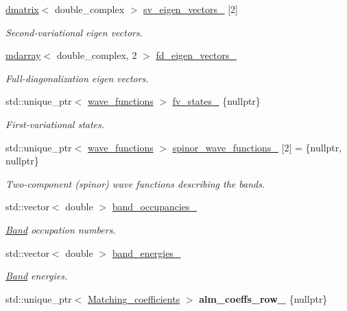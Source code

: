 \begin{DoxyCompactItemize}
\item 
\hyperlink{classsddk_1_1dmatrix}{dmatrix}$<$ double\+\_\+complex $>$ \hyperlink{classsirius_1_1_k__point_afb5d65a6fb66c2532aefe946a0513eea}{sv\+\_\+eigen\+\_\+vectors\+\_\+} \mbox{[}2\mbox{]}
\begin{DoxyCompactList}\small\item\em Second-\/variational eigen vectors. \end{DoxyCompactList}\item 
\hyperlink{classsddk_1_1mdarray}{mdarray}$<$ double\+\_\+complex, 2 $>$ \hyperlink{classsirius_1_1_k__point_a48ae51c27177ebd8fdd019a127ef74f9}{fd\+\_\+eigen\+\_\+vectors\+\_\+}
\begin{DoxyCompactList}\small\item\em Full-\/diagonalization eigen vectors. \end{DoxyCompactList}\item 
std\+::unique\+\_\+ptr$<$ \hyperlink{classsddk_1_1wave__functions}{wave\+\_\+functions} $>$ \hyperlink{classsirius_1_1_k__point_aca363c2385edb532f9e266c1956dbb5f}{fv\+\_\+states\+\_\+} \{nullptr\}
\begin{DoxyCompactList}\small\item\em First-\/variational states. \end{DoxyCompactList}\item 
std\+::unique\+\_\+ptr$<$ \hyperlink{classsddk_1_1wave__functions}{wave\+\_\+functions} $>$ \hyperlink{classsirius_1_1_k__point_a9c1d2d51e282f776c034d80a698885a9}{spinor\+\_\+wave\+\_\+functions\+\_\+} \mbox{[}2\mbox{]} = \{nullptr, nullptr\}
\begin{DoxyCompactList}\small\item\em Two-\/component (spinor) wave functions describing the bands. \end{DoxyCompactList}\item 
std\+::vector$<$ double $>$ \hyperlink{classsirius_1_1_k__point_afe99a469c933f236459d322eef90af16}{band\+\_\+occupancies\+\_\+}
\begin{DoxyCompactList}\small\item\em \hyperlink{classsirius_1_1_band}{Band} occupation numbers. \end{DoxyCompactList}\item 
std\+::vector$<$ double $>$ \hyperlink{classsirius_1_1_k__point_ad1212379cf77eb9c948336b60c06622f}{band\+\_\+energies\+\_\+}
\begin{DoxyCompactList}\small\item\em \hyperlink{classsirius_1_1_band}{Band} energies. \end{DoxyCompactList}\item 
\hypertarget{classsirius_1_1_k__point_a5cee5478e7682507c3084639d9b5b17d}{}std\+::unique\+\_\+ptr$<$ \hyperlink{classsirius_1_1_matching__coefficients}{Matching\+\_\+coefficients} $>$ {\bfseries alm\+\_\+coeffs\+\_\+row\+\_\+} \{nullptr\}\label{classsirius_1_1_k__point_a5cee5478e7682507c3084639d9b5b17d}


\end{DoxyCompactItemize}
